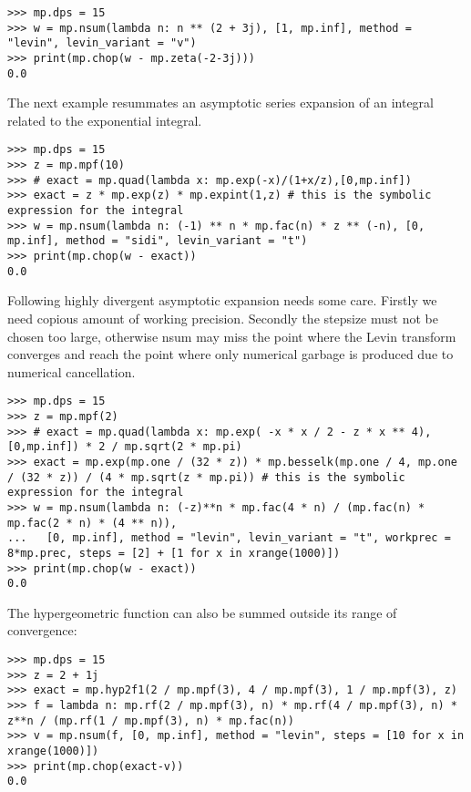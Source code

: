 \begin{lstlisting}
>>> mp.dps = 15
>>> w = mp.nsum(lambda n: n ** (2 + 3j), [1, mp.inf], method = "levin", levin_variant = "v")
>>> print(mp.chop(w - mp.zeta(-2-3j)))
0.0
\end{lstlisting}

The next example resummates an asymptotic series expansion of an integral related to the exponential integral.


\begin{lstlisting}
>>> mp.dps = 15
>>> z = mp.mpf(10)
>>> # exact = mp.quad(lambda x: mp.exp(-x)/(1+x/z),[0,mp.inf])
>>> exact = z * mp.exp(z) * mp.expint(1,z) # this is the symbolic expression for the integral
>>> w = mp.nsum(lambda n: (-1) ** n * mp.fac(n) * z ** (-n), [0, mp.inf], method = "sidi", levin_variant = "t")
>>> print(mp.chop(w - exact))
0.0
\end{lstlisting}

Following highly divergent asymptotic expansion needs some care. Firstly we need copious amount of working precision. Secondly the stepsize must not be chosen too large, otherwise nsum may miss the point where the Levin transform converges and reach the point where only numerical garbage is produced due to numerical cancellation.


\begin{lstlisting}
>>> mp.dps = 15
>>> z = mp.mpf(2)
>>> # exact = mp.quad(lambda x: mp.exp( -x * x / 2 - z * x ** 4), [0,mp.inf]) * 2 / mp.sqrt(2 * mp.pi)
>>> exact = mp.exp(mp.one / (32 * z)) * mp.besselk(mp.one / 4, mp.one / (32 * z)) / (4 * mp.sqrt(z * mp.pi)) # this is the symbolic expression for the integral
>>> w = mp.nsum(lambda n: (-z)**n * mp.fac(4 * n) / (mp.fac(n) * mp.fac(2 * n) * (4 ** n)),
...   [0, mp.inf], method = "levin", levin_variant = "t", workprec = 8*mp.prec, steps = [2] + [1 for x in xrange(1000)])
>>> print(mp.chop(w - exact))
0.0
\end{lstlisting}

The hypergeometric function can also be summed outside its range of convergence:


\begin{lstlisting}
>>> mp.dps = 15
>>> z = 2 + 1j
>>> exact = mp.hyp2f1(2 / mp.mpf(3), 4 / mp.mpf(3), 1 / mp.mpf(3), z)
>>> f = lambda n: mp.rf(2 / mp.mpf(3), n) * mp.rf(4 / mp.mpf(3), n) * z**n / (mp.rf(1 / mp.mpf(3), n) * mp.fac(n))
>>> v = mp.nsum(f, [0, mp.inf], method = "levin", steps = [10 for x in xrange(1000)])
>>> print(mp.chop(exact-v))
0.0
\end{lstlisting}

